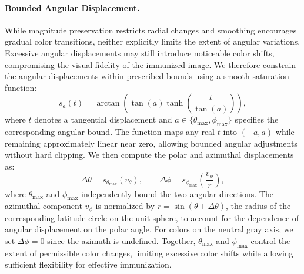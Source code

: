 \paragraph{Bounded Angular Displacement.}
While magnitude preservation restricts radial changes and smoothing encourages gradual color transitions, neither explicitly limits the extent of angular variations. Excessive angular displacements may still introduce noticeable color shifts, compromising the visual fidelity of the immunized image. We therefore constrain the angular displacements within prescribed bounds using a smooth saturation function:
\begin{equation}
s_a(t)=\arctan\left(\tan(a)\tanh\left(\frac{t}{\tan(a)}\right)\right),
\label{eq:bounds}
\end{equation}
where $t$ denotes a tangential displacement and $a \in \{\theta_{\max}, \phi_{\max}\}$ specifies the corresponding angular bound. The function maps any real $t$ into $(-a, a)$ while remaining approximately linear near zero, allowing bounded angular adjustments without hard clipping. We then compute the polar and azimuthal displacements as:
\begin{equation}
\Delta\theta = s_{\theta_{\max}}(v_\theta), \qquad
\Delta\phi = s_{\phi_{\max}}\!\left(\frac{v_\phi}{r}\right),
\label{eq:increments}
\end{equation}
where $\theta_{\max}$ and $\phi_{\max}$ independently bound the two angular directions. The azimuthal component $v_\phi$ is normalized by $r=\sin(\theta+\Delta\theta)$, the radius of the corresponding latitude circle on the unit sphere, to account for the dependence of angular displacement on the polar angle. For colors on the neutral gray axis, we set $\Delta\phi=0$ since the azimuth is undefined. Together, $\theta_{\max}$ and $\phi_{\max}$ control the extent of permissible color changes, limiting excessive color shifts while allowing sufficient flexibility for effective immunization.





